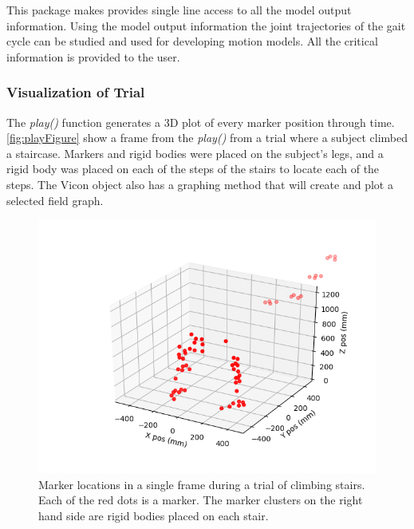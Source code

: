 

This package makes provides single line access to all the model output information. Using the model output information the joint trajectories of the gait cycle can be studied and used for developing motion models. All the critical information is provided to the user.  



\subsubsection{Visualization of Trial}
The \textit{play()} function generates a 3D plot of every marker position through time. \autoref{fig:playFigure} show a frame from the \textit{play()} from a trial where a subject climbed a staircase. Markers and rigid bodies were placed on the subject's legs, and a rigid body was placed on each of the steps of the stairs to locate each of the steps. The Vicon object also has a graphing method that will create and plot a selected field graph.

\begin{figure}
    \centering
    \includegraphics[scale=0.6]{images/software/play.png}
   \caption[Play Figure]{Marker locations in a single frame during a trial of climbing stairs. Each of the red dots is a marker. The marker clusters on the right hand side are rigid bodies placed on each stair. }
    \label{fig:playFigure}
\end{figure}


